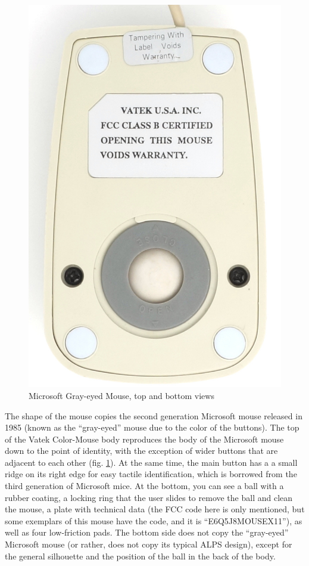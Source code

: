 \documentclass[11pt, a4paper]{article}
\begin{document}
\begin{figure}[h]
    \includegraphics[scale=0.55]{1989_vatek_color_mouse/bottom_30.jpg}
    \caption{Microsoft Gray-eyed Mouse, top and bottom views}
    \label{fig:VatekColorTopAndBottom}
\end{figure}

The shape of the mouse copies the second generation Microsoft mouse released in 1985 (known as the ``gray-eyed'' mouse due to the color of the buttons). The top of the Vatek Color-Mouse body reproduces the body of the Microsoft mouse down to the point of identity, with the exception of wider buttons that are adjacent to each other (fig. \ref{fig:VatekColorTopAndBottom}). At the same time, the main button has a a small ridge on its right edge for easy tactile identification, which is borrowed from the third generation of Microsoft mice.
At the bottom, you can see a ball with a rubber coating, a locking ring that the user slides to remove the ball and clean the mouse, a plate with technical data (the FCC code here is only mentioned, but some exemplars of this mouse have the code, and it is “E6Q5J8MOUSEX11”), as well as four low-friction pads. The bottom side does not copy the ``gray-eyed'' Microsoft mouse (or rather, does not copy its typical ALPS design), except for the general silhouette and the position of the ball in the back of the body.
\end{document}
